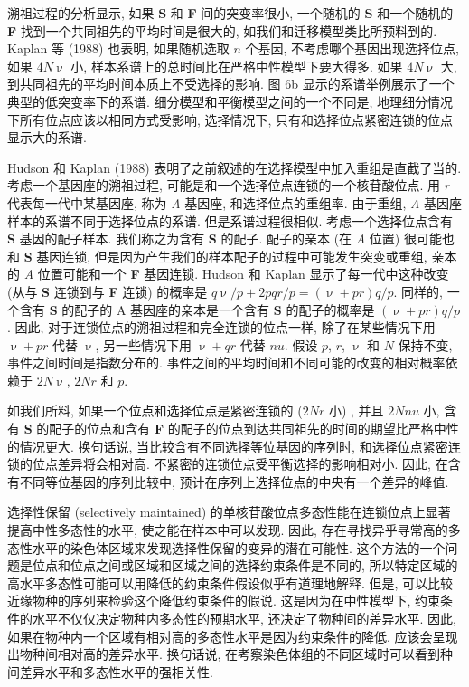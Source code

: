 \documentclass[
    12pt,%
    ]{article}
\begin{document}
溯祖过程的分析显示, 如果 \textbf{S} 和 \textbf{F} 间的突变率很小,
一个随机的 \textbf{S} 和一个随机的 \textbf{F} 找到一个共同祖先的平均时间是很大的, 如我们和迁移模型类比所预料到的. Kaplan
等 (1988) 也表明, 如果随机选取 $n$ 个基因, 不考虑哪个基因出现选择位点, 如果 $4N\upnu$ 小,
样本系谱上的总时间比在严格中性模型下要大得多. 如果 $4N\upnu$ 大, 到共同祖先的平均时间本质上不受选择的影响. 图 6b
显示的系谱举例展示了一个典型的低突变率下的系谱. 细分模型和平衡模型之间的一个不同是,
地理细分情况下所有位点应该以相同方式受影响, 选择情况下, 只有和选择位点紧密连锁的位点显示大的系谱.

Hudson 和 Kaplan (1988) 表明了之前叙述的在选择模型中加入重组是直截了当的. 考虑一个基因座的溯祖过程,
可能是和一个选择位点连锁的一个核苷酸位点. 用 $r$ 代表每一代中某基因座, 称为 \textit{A} 基因座, 和选择位点的重组率.
由于重组, \textit{A} 基因座样本的系谱不同于选择位点的系谱. 但是系谱过程很相似.
考虑一个选择位点含有 \textbf{S} 基因的配子样本. 我们称之为含有 \textbf{S} 的配子. 配子的亲本 (在 \textit{A} 位置)
很可能也和 \textbf{S} 基因连锁, 但是因为产生我们的样本配子的过程中可能发生突变或重组,
亲本的 \textit{A} 位置可能和一个 \textbf{F} 基因连锁. Hudson 和 Kaplan 显示了每一代中这种改变
(从与 \textbf{S} 连锁到与 \textbf{F} 连锁) 的概率是 $q\upnu/p+2pqr/p=(\upnu+pr)q/p$. 同样的,
一个含有 \textbf{S} 的配子的 A 基因座的亲本是一个含有 \textbf{S} 的配子的概率是 $(\upnu+pr)q/p$. 因此,
对于连锁位点的溯祖过程和完全连锁的位点一样, 除了在某些情况下用 $\upnu+pr$ 代替 $\upnu$, 另一些情况下用 $\upnu+qr$ 代替 $nu
$. 假设 $p$, $r$, $\upnu$ 和 $N$ 保持不变, 事件之间时间是指数分布的. 事件之间的平均时间和不同可能的改变的相对概率依赖于
$2N\upnu$, $2Nr$ 和 $p$.

如我们所料, 如果一个位点和选择位点是紧密连锁的 ($2Nr$ 小) , 并且 $2Nnu$ 小,
含有 \textbf{S} 的配子的位点和含有 \textbf{F} 的配子的位点到达共同祖先的时间的期望比严格中性的情况更大. 换句话说,
当比较含有不同选择等位基因的序列时, 和选择位点紧密连锁的位点差异将会相对高. 不紧密的连锁位点受平衡选择的影响相对小. 因此,
在含有不同等位基因的序列比较中, 预计在序列上选择位点的中央有一个差异的峰值.

选择性保留 (selectively maintained) 的单核苷酸位点多态性能在连锁位点上显著提高中性多态性的水平,
使之能在样本中可以发现. 因此, 存在寻找异乎寻常高的多态性水平的染色体区域来发现选择性保留的变异的潜在可能性.
这个方法的一个问题是位点和位点之间或区域和区域之间的选择约束条件是不同的,
所以特定区域的高水平多态性可能可以用降低的约束条件假设似乎有道理地解释. 但是,
可以比较近缘物种的序列来检验这个降低约束条件的假说. 这是因为在中性模型下, 约束条件的水平不仅仅决定物种内多态性的预期水平,
还决定了物种间的差异水平. 因此, 如果在物种内一个区域有相对高的多态性水平是因为约束条件的降低,
应该会呈现出物种间相对高的差异水平. 换句话说, 在考察染色体组的不同区域时可以看到种间差异水平和多态性水平的强相关性.
\end{document}
